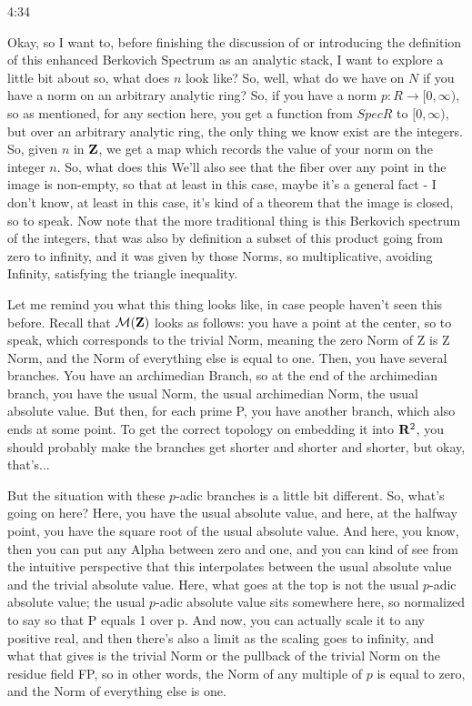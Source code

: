 \begin{unfinished}{4:34}
\begin{example}
Okay, so I want to, before finishing the discussion of or introducing the definition of this enhanced Berkovich Spectrum as an analytic stack, I want to explore a little bit about so, what does $n$ look like? So, well, what do we have on $N$ if you have a norm on an arbitrary analytic ring? So, if you have a norm $p: R \to [0, \infty)$, so as mentioned, for any section here, you get a function from $Spec R$ to $[0, \infty)$, but over an arbitrary analytic ring, the only thing we know exist are the integers. So, given $n$ in $\mathbf Z$, we get a map which records the value of your norm on the integer $n$. So, what does this
We'll also see that the fiber over any point in the image is non-empty, so that at least in this case, maybe it's a general fact - I don't know, at least in this case, it's kind of a theorem that the image is closed, so to speak. Now note that the more traditional thing is this Berkovich spectrum of the integers, that was also by definition a subset of this product going from zero to infinity, and it was given by those Norms, so multiplicative, avoiding Infinity, satisfying the triangle inequality.

Let me remind you what this thing looks like, in case people haven't seen this before. Recall that $\mathcal M(\mathbf Z)$ looks as follows: you have a point at the center, so to speak, which corresponds to the trivial Norm, meaning the zero Norm of Z is Z Norm, and the Norm of everything else is equal to one. Then, you have several branches. You have an archimedian Branch, so at the end of the archimedian branch, you have the usual Norm, the usual archimedian Norm, the usual absolute value. But then, for each prime P, you have another branch, which also ends at some point. To get the correct topology on embedding it into $\mathbf R^2$, you should probably make the branches get shorter and shorter and shorter, but okay, that's...

But the situation with these $p$-adic branches is a little bit different. So, what's going on here? Here, you have the usual absolute value, and here, at the halfway point, you have the square root of the usual absolute value. And here, you know, then you can put any Alpha between zero and one, and you can kind of see from the intuitive perspective that this interpolates between the usual absolute value and the trivial absolute value. Here, what goes at the top is not the usual $p$-adic absolute value; the usual $p$-adic absolute value sits somewhere here, so normalized to say so that P equals 1 over p. And now, you can actually scale it to any positive real, and then there's also a limit as the scaling goes to infinity, and what that gives is the trivial Norm or the pullback of the trivial Norm on the residue field FP, so in other words, the Norm of any multiple of $p$ is equal to zero, and the Norm of everything else is one.


\end{example}
\end{unfinished}
